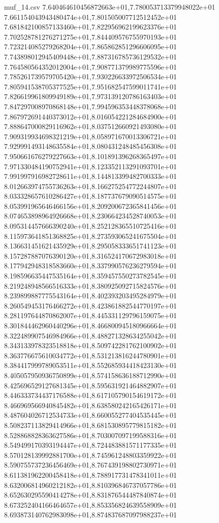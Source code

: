 \begin{filecontents*}{muf_14.csv}
7.640464610456872663e+01,7.780053713379948022e+01
7.661154043943480474e+01,7.801505007712512452e+01
7.681842100857133460e+01,7.822956962199623376e+01
7.702528781276271275e+01,7.844409576755970193e+01
7.723214085279268204e+01,7.865862851296606095e+01
7.743898012945409448e+01,7.887316785736129532e+01
7.764580564352012004e+01,7.908771379989775596e+01
7.785261739579705420e+01,7.930226633972506534e+01
7.805941538705377525e+01,7.951682547599011741e+01
7.826619961809949189e+01,7.973139120786163403e+01
7.847297008970868148e+01,7.994596353448378068e+01
7.867972691440373012e+01,8.016054221284684900e+01
7.888647000829116962e+01,8.037512660921493080e+01
7.909319934698321219e+01,8.058971670013306721e+01
7.929991493148635584e+01,8.080431248485456308e+01
7.950661676279227663e+01,8.101891396268365497e+01
7.971330484190752941e+01,8.123352113291093701e+01
7.991997916982728611e+01,8.144813399482700333e+01
8.012663974755736263e+01,8.166275254772244807e+01
8.033328657610286427e+01,8.187737679090514575e+01
8.053991965646466156e+01,8.209200672365841456e+01
8.074653898964926668e+01,8.230664234528740053e+01
8.095314457666390240e+01,8.252128365510725416e+01
8.115973641851368825e+01,8.273593065241675504e+01
8.136631451621435929e+01,8.295058333651741123e+01
8.157287887076390120e+01,8.316524170672983018e+01
8.177942948318583660e+01,8.337990576236279594e+01
8.198596635447535164e+01,8.359457550273782545e+01
8.219248948566516333e+01,8.380925092715824576e+01
8.239899887775543164e+01,8.402393203495284979e+01
8.260549453176466272e+01,8.423861882544770197e+01
8.281197644870862007e+01,8.445331129796159075e+01
8.301844462960440296e+01,8.466800945180966664e+01
8.322489907546984966e+01,8.488271328634255042e+01
8.343133978323518818e+01,8.509742281762100902e+01
8.363776675610034772e+01,8.531213816244780901e+01
8.384417999789053511e+01,8.552685934418423130e+01
8.405057950936750899e+01,8.574158636188712990e+01
8.425696529127681345e+01,8.595631921464882907e+01
8.446333734437176588e+01,8.617105790154619172e+01
8.466969566940845482e+01,8.638580242165426171e+01
8.487604026712534733e+01,8.660055277404535445e+01
8.508237113829414966e+01,8.681530895779815182e+01
8.528868828363627586e+01,8.703007097199588316e+01
8.549499170393194447e+01,8.724483881571177335e+01
8.570128139992881700e+01,8.745961248803359922e+01
8.590755737236456469e+01,8.767439198802730971e+01
8.611381962200458418e+01,8.788917731478341011e+01
8.632006814960212182e+01,8.810396846737057786e+01
8.652630295590414278e+01,8.831876544487840874e+01
8.673252404166464657e+01,8.853356824639558909e+01
8.693873140762983098e+01,8.874837687097988237e+01

\end{filecontents*}
